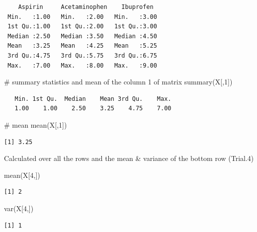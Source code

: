 \documentclass[
  letterpaper,
  DIV=11,
  numbers=noendperiod]{scrreprt}
\newenvironment{Shaded}{\begin{snugshade}}{\end{snugshade}}
\newcommand{\CommentTok}[1]{\textcolor[rgb]{0.37,0.37,0.37}{#1}}
\newcommand{\DecValTok}[1]{\textcolor[rgb]{0.68,0.00,0.00}{#1}}
\newcommand{\FunctionTok}[1]{\textcolor[rgb]{0.28,0.35,0.67}{#1}}
\newcommand{\NormalTok}[1]{\textcolor[rgb]{0.00,0.23,0.31}{#1}}
\begin{document}
\begin{verbatim}
    Aspirin     Acetaminophen    Ibuprofen   
 Min.   :1.00   Min.   :2.00   Min.   :3.00  
 1st Qu.:1.00   1st Qu.:2.00   1st Qu.:3.00  
 Median :2.50   Median :3.50   Median :4.50  
 Mean   :3.25   Mean   :4.25   Mean   :5.25  
 3rd Qu.:4.75   3rd Qu.:5.75   3rd Qu.:6.75  
 Max.   :7.00   Max.   :8.00   Max.   :9.00  
\end{verbatim}

\begin{Shaded}
\begin{Highlighting}[]
\CommentTok{\# summary statistics and mean of the column 1 of matrix}
\FunctionTok{summary}\NormalTok{(X[,}\DecValTok{1}\NormalTok{])}
\end{Highlighting}
\end{Shaded}

\begin{verbatim}
   Min. 1st Qu.  Median    Mean 3rd Qu.    Max. 
   1.00    1.00    2.50    3.25    4.75    7.00 
\end{verbatim}

\begin{Shaded}
\begin{Highlighting}[]
\CommentTok{\# mean}
\FunctionTok{mean}\NormalTok{(X[,}\DecValTok{1}\NormalTok{])}
\end{Highlighting}
\end{Shaded}

\begin{verbatim}
[1] 3.25
\end{verbatim}

Calculated over all the rows and the mean \& variance of the bottom row
(Trial.4)

\begin{Shaded}
\begin{Highlighting}[]
\FunctionTok{mean}\NormalTok{(X[}\DecValTok{4}\NormalTok{,])}
\end{Highlighting}
\end{Shaded}

\begin{verbatim}
[1] 2
\end{verbatim}

\begin{Shaded}
\begin{Highlighting}[]
\FunctionTok{var}\NormalTok{(X[}\DecValTok{4}\NormalTok{,])}
\end{Highlighting}
\end{Shaded}

\begin{verbatim}
[1] 1
\end{verbatim}
\end{document}
